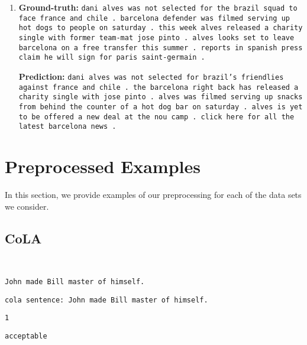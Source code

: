 \documentclass[twoside,11pt]{article}
\begin{document}
\begin{enumerate}
\item \textbf{Ground-truth:} \texttt{dani alves was not selected for the brazil squad to face france and chile . barcelona defender was filmed serving up hot dogs to people on saturday . this week alves released a charity single with former team-mat jose pinto . alves looks set to leave barcelona on a free transfer this summer . reports in spanish press claim he will sign for paris saint-germain .}

\textbf{Prediction:} \texttt{dani alves was not selected for brazil's friendlies against france and chile . the barcelona right back has released a charity single with jose pinto . alves was filmed serving up snacks from behind the counter of a hot dog bar on saturday . alves is yet to be offered a new deal at the nou camp . click here for all the latest barcelona news .}

\end{enumerate}

\section{Preprocessed Examples}
\label{sec:preprocessing}



In this section, we provide examples of our preprocessing for each of the data sets we consider.

\subsection{CoLA}
\begin{description}[leftmargin=0.5cm]
\item[Original input:] ~
\begin{description}[leftmargin=0.5cm]
  \item[Sentence:] \texttt{John made Bill master of himself.}
\end{description}
\item[Processed input:] \texttt{cola sentence:\ John made Bill master of himself.}
\item[Original target:] \texttt{1}
\item[Processed target:] \texttt{acceptable}
\end{description}
\end{document}
